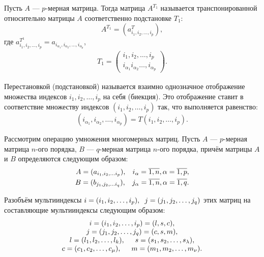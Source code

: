 Пусть $A$ --- $p$-мерная матрица. Тогда матрица $A^{T_1}$ называется транспонированной
относительно матрицы $A$ соответственно подстановке $T_1$:
\begin{equation}
\label{eq:tr}
  A^{T_1} = (a^T_{i_1, i_2, \dots, i_p}),
\end{equation}
где $a^{T^1}_{i_1, i_2, \dots, i_p} = a_{i_{\alpha_1}, i_{\alpha_2}, \dots, i_{\alpha_p}}$,
\[
  \begin{array}{lc}
    T_1 = 
    \left(
      \begin{matrix}
        i_1, i_2, \dots, i_p \\
        i_{\alpha_1} i_{\alpha_2} \dots, i_{\alpha_p}
      \end{matrix}
    \right).
  \end{array}
\]

Перестановкой (подстановкой) называется взаимно однозначное отображение
множества индексов $i_1, i_2, \dots, i_p$ на себя (биекция). Это отображение ставит
в соответствие множеству индексов $(i_1, i_2, \dots, i_p)$ так, что выполняется
равенство:
\[
  (i_{\alpha_1}, i_{\alpha_2}, \dots, i_{\alpha_p}) = T(i_1, i_2, \dots, i_p).
\]

Рассмотрим операцию умножения многомерных матриц. Пусть $A$ --- $p$-мерная
матрица $n$-ого порядка, $B$ --- $q$-мерная матрица $n$-ого порядка,
причём матрицы $A$ и $B$ определяются следующим образом:
\begin{align*}
  A = (a_{i_1, i_2, \dots i_p}), \hspace{3mm} i_{\alpha} = \overline{1,n}, \alpha = \overline{1,p}, \\
  B = (b_{j_1, j_2, \dots i_q}), \hspace{3mm} j_{\alpha} = \overline{1,n}, \alpha = \overline{1,q}.
\end{align*}

Разобъём мультииндексы $i = (i_1, i_2, \dots, i_p), \hspace{2mm} j = (j_1, j_2, \dots, j_q)$ этих матриц
на составляющие мультииндексы следующим образом:
\[
  \begin{array}{lc}
    \begin{matrix}
      i = (i_1, i_2, \dots, i_p) = (l, s, c), \\
      j = (j_1, j_2, \dots, j_q) = (c, s, m), \\
      l = (l_1, l_2, \dots, l_k), \hspace{5mm} s = (s_1, s_2, \dots, s_{\lambda}), \\
      c = (c_1, c_2, \dots, c_\mu), \hspace{5mm} m = (m_1, m_2, \dots, m_{\nu}).
    \end{matrix}
  \end{array}
\]

